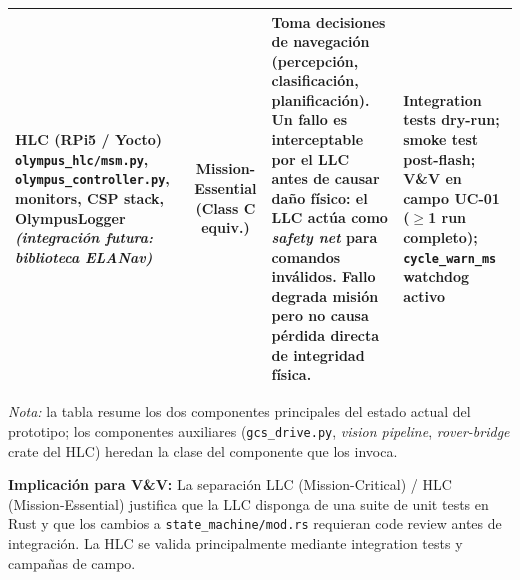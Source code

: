 \begin{landscape}
\begin{longtable}{| p{5.0cm} | c | p{9.5cm} | p{5.5cm} |}
HLC \newline (RPi5 / Yocto) \newline \texttt{olympus\_hlc/msm.py}, \newline \texttt{olympus\_controller.py}, \newline monitors, CSP stack, \newline OlympusLogger \newline \emph{(integración futura: biblioteca ELANav)} &
Mission-Essential (Class C equiv.) &
Toma decisiones de navegación (percepción, clasificación, planificación). Un fallo es interceptable por el LLC antes de causar daño físico: el LLC actúa como \emph{safety net} para comandos inválidos. Fallo degrada misión pero no causa pérdida directa de integridad física. &
Integration tests dry-run; smoke test post-flash; V\&V en campo UC-01 ($\ge$1 run completo); \texttt{cycle\_warn\_ms} watchdog activo \\ \hline

\end{longtable}
\end{landscape}

\emph{Nota:} la tabla resume los dos componentes principales del estado actual del prototipo; los componentes auxiliares (\texttt{gcs\_drive.py}, \emph{vision pipeline}, \emph{rover-bridge} crate del HLC) heredan la clase del componente que los invoca.

\textbf{Implicación para V\&V:} La separación LLC (Mission-Critical) / HLC (Mission-Essential) justifica que la LLC disponga de una suite de unit tests en Rust y que los cambios a \texttt{state\_\allowbreak machine/\allowbreak mod.rs} requieran code review antes de integración. La HLC se valida principalmente mediante integration tests y campañas de campo.
